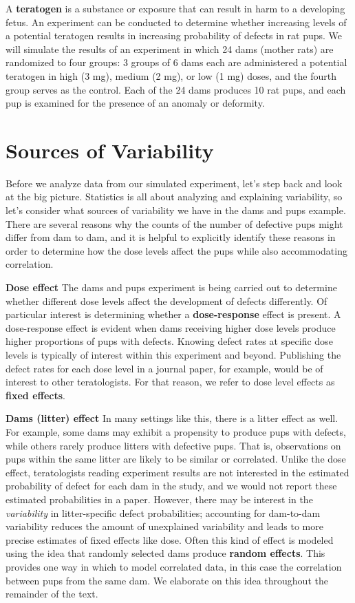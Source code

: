 \documentclass[
]{krantz}
\begin{document}
A \textbf{teratogen} is a substance or exposure that can result in harm to a developing fetus. An experiment can be conducted to determine whether increasing levels of a potential teratogen results in increasing probability of defects in rat pups. We will simulate the results of an experiment in which 24 dams (mother rats) are randomized to four groups: 3 groups of 6 dams each are administered a potential teratogen in high (3 mg), medium (2 mg), or low (1 mg) doses, and the fourth group serves as the control. Each of the 24 dams produces 10 rat pups, and each pup is examined for the presence of an anomaly or deformity.

\section{Sources of Variability}\label{sources-of-variability}

Before we analyze data from our simulated experiment, let's step back and look at the big picture. Statistics is all about analyzing and explaining variability, so let's consider what sources of variability we have in the dams and pups example. There are several reasons why the counts of the number of defective pups might differ from dam to dam, and it is helpful to explicitly identify these reasons in order to determine how the dose levels affect the pups while also accommodating correlation.

\textbf{Dose effect} The dams and pups experiment is being carried out to determine whether different dose levels affect the development of defects differently. Of particular interest is determining whether a \textbf{dose-response}  effect is present. A dose-response effect is evident when dams receiving higher dose levels produce higher proportions of pups with defects. Knowing defect rates at specific dose levels is typically of interest within this experiment and beyond. Publishing the defect rates for each dose level in a journal paper, for example, would be of interest to other teratologists. For that reason, we refer to dose level effects as \textbf{fixed effects}. 

\textbf{Dams (litter) effect} In many settings like this, there is a litter effect as well. For example, some dams may exhibit a propensity to produce pups with defects, while others rarely produce litters with defective pups. That is, observations on pups within the same litter are likely to be similar or correlated. Unlike the dose effect, teratologists reading experiment results are not interested in the estimated probability of defect for each dam in the study, and we would not report these estimated probabilities in a paper. However, there may be interest in the \emph{variability} in litter-specific defect probabilities; accounting for dam-to-dam variability reduces the amount of unexplained variability and leads to more precise estimates of fixed effects like dose. Often this kind of effect is modeled using the idea that randomly selected dams produce \textbf{random effects}.  This provides one way in which to model correlated data, in this case the correlation between pups from the same dam. We elaborate on this idea throughout the remainder of the text.
\end{document}
